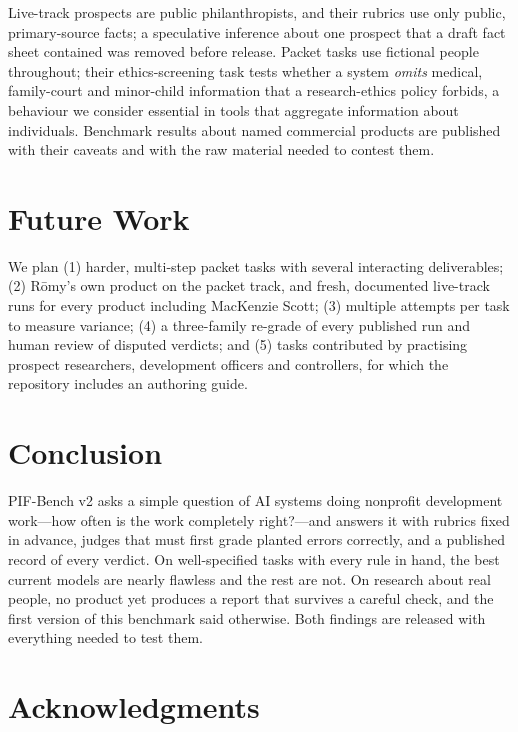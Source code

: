 \documentclass[11pt,a4paper]{article}
\newcommand{\romy}{R\={o}my}
\begin{document}
Live-track prospects are public philanthropists, and their rubrics use only public, primary-source facts; a speculative inference about one prospect that a draft fact sheet contained was removed before release. Packet tasks use fictional people throughout; their ethics-screening task tests whether a system \emph{omits} medical, family-court and minor-child information that a research-ethics policy forbids, a behaviour we consider essential in tools that aggregate information about individuals. Benchmark results about named commercial products are published with their caveats and with the raw material needed to contest them.

\section{Future Work}
\label{sec:future}

We plan (1) harder, multi-step packet tasks with several interacting deliverables; (2) \romy's own product on the packet track, and fresh, documented live-track runs for every product including MacKenzie Scott; (3) multiple attempts per task to measure variance; (4) a three-family re-grade of every published run and human review of disputed verdicts; and (5) tasks contributed by practising prospect researchers, development officers and controllers, for which the repository includes an authoring guide.

\section{Conclusion}
\label{sec:conclusion}

PIF-Bench v2 asks a simple question of AI systems doing nonprofit development work---how often is the work completely right?---and answers it with rubrics fixed in advance, judges that must first grade planted errors correctly, and a published record of every verdict. On well-specified tasks with every rule in hand, the best current models are nearly flawless and the rest are not. On research about real people, no product yet produces a report that survives a careful check, and the first version of this benchmark said otherwise. Both findings are released with everything needed to test them.

\section*{Acknowledgments}
\end{document}
